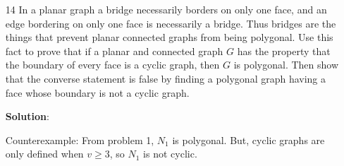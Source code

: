 \documentclass{article}
\begin{document}
\begin{enumerate}
	\item[14] In a planar graph a bridge necessarily borders on only one face, and an edge bordering on only one face is necessarily a bridge. Thus bridges are the things that prevent planar connected graphs from being polygonal. Use this fact to prove that if a planar and connected graph $G$ has the property that the boundary of every face is a cyclic graph, then $G$ is polygonal. Then show that the converse statement is false by finding a polygonal graph having a face whose boundary is not a cyclic graph.
	
	\textbf{Solution}:
	
	Counterexample: From problem 1, $N_1$ is polygonal. But, cyclic graphs are only defined when $v \geq 3$, so $N_1$ is not cyclic.
\end{enumerate}
\end{document}
